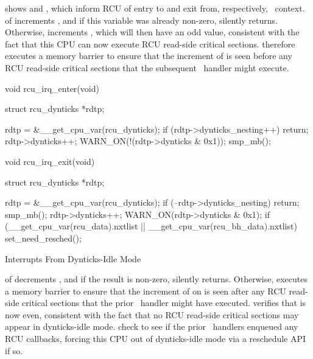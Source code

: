 \begin{fcvref}
shows  and , which
inform RCU of entry to and exit from, respectively, \IRQ\ context.
 of  increments ,
and if this variable was already non-zero,  silently returns.
Otherwise,  increments ,
which will then have
an odd value, consistent with the fact that this CPU can now
execute RCU read-side critical sections.
 therefore executes a memory barrier to ensure that
the increment of  is seen before any
RCU read-side critical sections that the subsequent \IRQ\ handler
might execute.

\begin{listing}
\begin{fcvlabel}
\begin{VerbatimL}[commandchars=\\\[\]]
void rcu_irq_enter(void)
{
	struct rcu_dynticks *rdtp;

	rdtp = &__get_cpu_var(rcu_dynticks);
	if (rdtp->dynticks_nesting++)		
		return;				\lnlbl[ret1]
	rdtp->dynticks++;			
	WARN_ON(!(rdtp->dynticks & 0x1));
	smp_mb();				\lnlbl[mb1]
}

void rcu_irq_exit(void)
{
	struct rcu_dynticks *rdtp;

	rdtp = &__get_cpu_var(rcu_dynticks);
	if (--rdtp->dynticks_nesting)		
		return;				\lnlbl[ret2]
	smp_mb();				\lnlbl[mb2]
	rdtp->dynticks++;			
	WARN_ON(rdtp->dynticks & 0x1);		
	if (__get_cpu_var(rcu_data).nxtlist ||	\lnlbl[chk_cb:b]
	    __get_cpu_var(rcu_bh_data).nxtlist)
		set_need_resched();		\lnlbl[chk_cb:e]
}
\end{VerbatimL}
\end{fcvlabel}
\caption{Interrupts From Dynticks-Idle Mode}
\label{lst:formal:Interrupts From Dynticks-Idle Mode}
\end{listing}

 of  decrements
, and
if the result is non-zero,  silently returns.
Otherwise,  executes a memory barrier to ensure that the
increment of  on  is seen after any RCU
read-side critical sections that the prior \IRQ\ handler might have executed.
 verifies that  is now even, consistent with
the fact that no RCU read-side critical sections may appear in
dynticks-idle mode.
 check to see
if the prior \IRQ\ handlers enqueued any
RCU callbacks, forcing this CPU out of dynticks-idle mode via
a reschedule API if so.
\end{fcvref}

